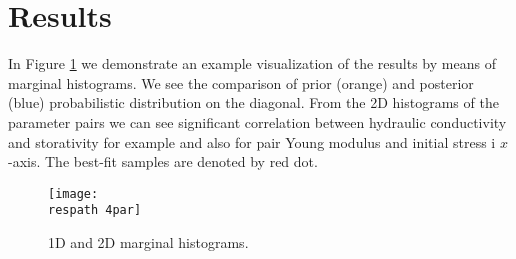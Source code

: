 \documentclass{article}
\newcommand{\respath}{results/}
\begin{document}
\section{Results}
In Figure \ref{fig:histograms} we demonstrate an example visualization of the results by means of marginal histograms. We see the comparison of prior (orange) and posterior (blue) probabilistic distribution on the diagonal. From the 2D histograms of the parameter pairs we can see significant correlation between hydraulic conductivity and storativity for example and also for pair Young modulus and initial stress i $x$-axis. The best-fit samples are denoted by red dot.


\begin{figure}[!htb]
    \centering
    \texttt{[image: \\respath 4par]}
    \caption{1D and 2D marginal histograms.}
    \label{fig:histograms}
\end{figure}

\newpage

\end{document}
